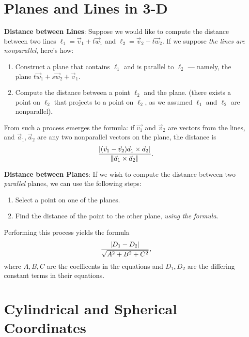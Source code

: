 \documentclass[11pt]{article}
\begin{document}

\section{Planes and Lines in 3-D}

\textbf{Distance between Lines}: Suppose we would like to compute the distance between two lines $\ell_{1} = \vec{v}_{1} + t\vec{w}_{1}$ and $\ell_{2} = \vec{v}_{2} + t \vec{w}_{2}$. If we suppose \textit{the lines are nonparallel}, here's how:

\begin{enumerate}
	\item Construct a plane that contains $\ell_{1}$ and is parallel to $\ell_{2}$ --- namely, the plane $t \vec{w}_{1} + s \vec{w}_{2} + \vec{v}_{1}$.
	\item Compute the distance between a point $\ell_{2}$ and the plane. (there exists a point on $\ell_{2}$ that projects to a point on $\ell_{2}$, as we assumed $\ell_{1}$ and $\ell_{2}$ are nonparallel).
\end{enumerate}

From such a process emerges the formula: if $\vec{v_{1}}$ and $\vec{v}_{2}$ are vectors from the lines, and $\vec{a}_{1}, \vec{a}_{2}$ are any two nonparallel vectors on the plane, the distance is
\[
	\frac{\abs{(\vec{v}_{1} - \vec{v}_{2}) \vec{a}_{1} \times \vec{a}_{2}}}{\norm{\vec{a}_{1} \times \vec{a}_{2}}}.
\]

\textbf{Distance between Planes}: If we wish to compute the distance between two \textit{parallel} planes, we can use the following steps:

\begin{enumerate}
	\item Select a point on one of the planes.
	\item Find the distance of the point to the other plane, \textit{using the formula}.
\end{enumerate}

Performing this process yields the formula
\[
	\frac{\abs{D_{1} - D_{2}}}{\sqrt{A^{2} + B^{2} + C^{2}}},
\]
where $A, B, C$ are the coefficents in the equations and $D_{1}, D_{2}$ are the differing constant terms in their equations.


\section{Cylindrical and Spherical Coordinates}
\end{document}
